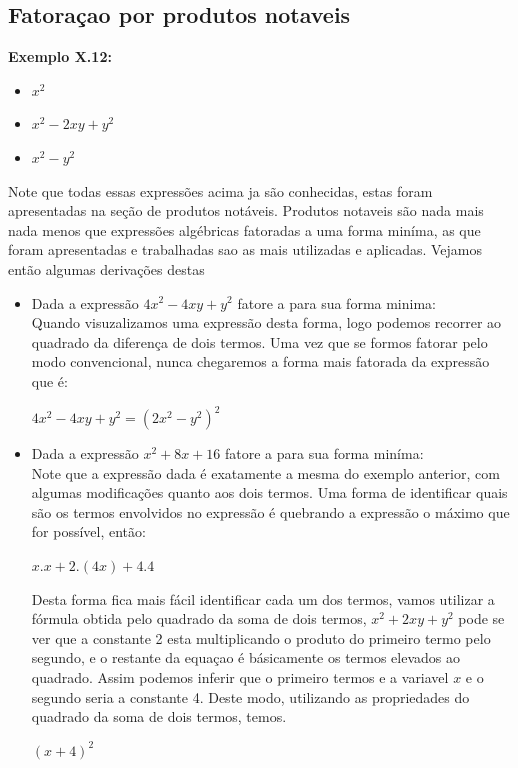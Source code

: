 \documentclass[a4paper,12pt,twoside,BCOR=10mm]{scrbook}
\begin{document}
\begin{titlepage}
\subsection{Fatoraçao por produtos notaveis}
\textbf{Exemplo X.12:}
\begin{itemize}
\item $x^{2}$
\item $x^{2} - 2xy + y^{2}$
\item $x^{2} - y^{2}$
\end{itemize}
Note que todas essas expressões acima ja são conhecidas, estas foram apresentadas na seção de produtos notáveis. Produtos notaveis são nada mais nada menos que expressões algébricas fatoradas a uma forma miníma, as que foram apresentadas e trabalhadas sao as mais utilizadas e aplicadas. Vejamos então algumas derivações destas
\begin{itemize}
\item Dada a expressão $4x^{2} - 4xy + y^{2}$ fatore a para sua forma minima:
\\
Quando visuzalizamos uma expressão desta forma, logo podemos recorrer ao quadrado da diferença de dois termos. Uma vez que se formos fatorar pelo modo convencional, nunca chegaremos a forma mais fatorada da expressão que é:
\\
\begin{center}
$4x^{2} - 4xy + y^{2} = (2x^{2} - y^{2})^{2}$
\end{center}
\item Dada a expressão $x^{2} + 8x + 16$ fatore a para sua forma miníma:
\\
Note que a expressão dada é exatamente a mesma do exemplo anterior, com algumas modificações quanto aos dois termos. Uma forma de identificar quais são os termos envolvidos no expressão é quebrando a expressão o máximo que for possível, então: 
\\
\begin{center}
$x.x + 2.(4x) + 4.4$
\end{center}
Desta forma fica mais fácil identificar cada um dos termos, vamos utilizar a fórmula obtida pelo quadrado da soma de dois termos, $x^{2} + 2xy + y^{2}$ pode se ver que a constante 2 esta multiplicando o produto do primeiro termo pelo segundo, e o restante da equaçao é básicamente os termos elevados ao quadrado. Assim podemos inferir que o primeiro termos e a variavel $x$ e o segundo seria a constante 4. Deste modo, utilizando as propriedades do quadrado da soma de dois termos, temos.
\\
\begin{center}
$(x + 4)^{2}$
\end{center}
\\
\end{itemize}

\end{titlepage}
\end{document}
